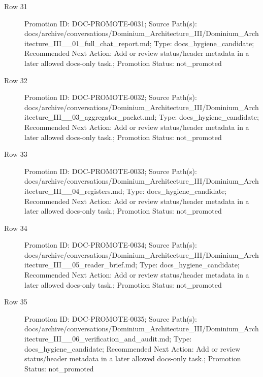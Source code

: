 \documentclass[9pt,a4paper,openany]{book}
\begin{document}
\begin{description}
\item[Row 31] Promotion ID: DOC-\allowbreak{}PROMOTE-\allowbreak{}0031; Source Path(s): docs/\allowbreak{}archive/\allowbreak{}conversations/\allowbreak{}Dominium\_\allowbreak{}Architecture\_\allowbreak{}III/\allowbreak{}Dominium\_\allowbreak{}Architecture\_\allowbreak{}III\_\allowbreak{}\_\allowbreak{}01\_\allowbreak{}full\_\allowbreak{}chat\_\allowbreak{}report.\allowbreak{}md; Type: docs\_\allowbreak{}hygiene\_\allowbreak{}candidate; Recommended Next Action: Add or review status/\allowbreak{}header metadata in a later allowed docs-\allowbreak{}only task.\allowbreak{}; Promotion Status: not\_\allowbreak{}promoted
\item[Row 32] Promotion ID: DOC-\allowbreak{}PROMOTE-\allowbreak{}0032; Source Path(s): docs/\allowbreak{}archive/\allowbreak{}conversations/\allowbreak{}Dominium\_\allowbreak{}Architecture\_\allowbreak{}III/\allowbreak{}Dominium\_\allowbreak{}Architecture\_\allowbreak{}III\_\allowbreak{}\_\allowbreak{}03\_\allowbreak{}aggregator\_\allowbreak{}packet.\allowbreak{}md; Type: docs\_\allowbreak{}hygiene\_\allowbreak{}candidate; Recommended Next Action: Add or review status/\allowbreak{}header metadata in a later allowed docs-\allowbreak{}only task.\allowbreak{}; Promotion Status: not\_\allowbreak{}promoted
\item[Row 33] Promotion ID: DOC-\allowbreak{}PROMOTE-\allowbreak{}0033; Source Path(s): docs/\allowbreak{}archive/\allowbreak{}conversations/\allowbreak{}Dominium\_\allowbreak{}Architecture\_\allowbreak{}III/\allowbreak{}Dominium\_\allowbreak{}Architecture\_\allowbreak{}III\_\allowbreak{}\_\allowbreak{}04\_\allowbreak{}registers.\allowbreak{}md; Type: docs\_\allowbreak{}hygiene\_\allowbreak{}candidate; Recommended Next Action: Add or review status/\allowbreak{}header metadata in a later allowed docs-\allowbreak{}only task.\allowbreak{}; Promotion Status: not\_\allowbreak{}promoted
\item[Row 34] Promotion ID: DOC-\allowbreak{}PROMOTE-\allowbreak{}0034; Source Path(s): docs/\allowbreak{}archive/\allowbreak{}conversations/\allowbreak{}Dominium\_\allowbreak{}Architecture\_\allowbreak{}III/\allowbreak{}Dominium\_\allowbreak{}Architecture\_\allowbreak{}III\_\allowbreak{}\_\allowbreak{}05\_\allowbreak{}reader\_\allowbreak{}brief.\allowbreak{}md; Type: docs\_\allowbreak{}hygiene\_\allowbreak{}candidate; Recommended Next Action: Add or review status/\allowbreak{}header metadata in a later allowed docs-\allowbreak{}only task.\allowbreak{}; Promotion Status: not\_\allowbreak{}promoted
\item[Row 35] Promotion ID: DOC-\allowbreak{}PROMOTE-\allowbreak{}0035; Source Path(s): docs/\allowbreak{}archive/\allowbreak{}conversations/\allowbreak{}Dominium\_\allowbreak{}Architecture\_\allowbreak{}III/\allowbreak{}Dominium\_\allowbreak{}Architecture\_\allowbreak{}III\_\allowbreak{}\_\allowbreak{}06\_\allowbreak{}verification\_\allowbreak{}and\_\allowbreak{}audit.\allowbreak{}md; Type: docs\_\allowbreak{}hygiene\_\allowbreak{}candidate; Recommended Next Action: Add or review status/\allowbreak{}header metadata in a later allowed docs-\allowbreak{}only task.\allowbreak{}; Promotion Status: not\_\allowbreak{}promoted

\end{description}
\end{document}
